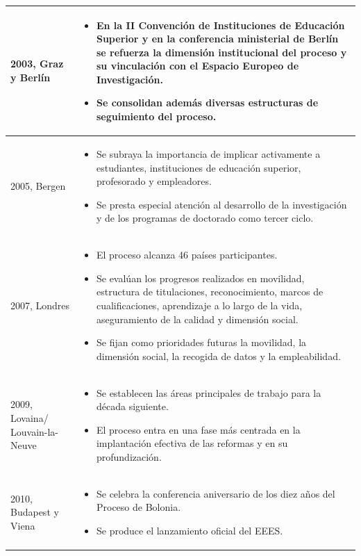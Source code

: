 \documentclass[
  11pt,
  a4paper,
  twoside]{scrreprt}
\begin{document}
\begin{longtable}{p{3cm} p{11.5cm}}
2003, Graz y Berlín &
\begin{itemize}
\item En la II Convención de Instituciones de Educación Superior y en la conferencia ministerial de Berlín se refuerza la dimensión institucional del proceso y su vinculación con el Espacio Europeo de Investigación.
\item Se consolidan además diversas estructuras de seguimiento del proceso.
\end{itemize}
\\ \hline

2005, Bergen &
\begin{itemize}
\item Se subraya la importancia de implicar activamente a estudiantes, instituciones de educación superior, profesorado y empleadores.
\item Se presta especial atención al desarrollo de la investigación y de los programas de doctorado como tercer ciclo.
\end{itemize}
\\ \hline

2007, Londres &
\begin{itemize}
\item El proceso alcanza 46 países participantes.
\item Se evalúan los progresos realizados en movilidad, estructura de titulaciones, reconocimiento, marcos de cualificaciones, aprendizaje a lo largo de la vida, aseguramiento de la calidad y dimensión social.
\item Se fijan como prioridades futuras la movilidad, la dimensión social, la recogida de datos y la empleabilidad.
\end{itemize}
\\ \hline

2009, Lovaina/ Louvain-la-Neuve &
\begin{itemize}
\item Se establecen las áreas principales de trabajo para la década siguiente.
\item El proceso entra en una fase más centrada en la implantación efectiva de las reformas y en su profundización.
\end{itemize}
\\ \hline

2010, Budapest y Viena &
\begin{itemize}
\item Se celebra la conferencia aniversario de los diez años del Proceso de Bolonia.
\item Se produce el lanzamiento oficial del EEES.
\end{itemize}
\\ \hline


\end{longtable}
\end{document}
